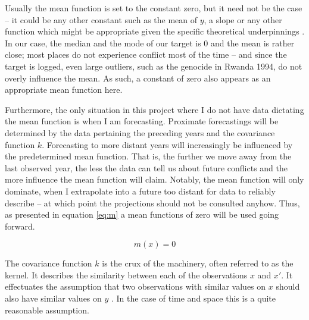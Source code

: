\documentclass[a4paper]{article}
\begin{document}
Usually the mean function is set to the constant zero, but it need not be the case -- it could be any other constant such as the mean of $y$, a slope or any other function which might be appropriate given the specific theoretical underpinnings \citep[28-29]{williams2006gaussian}. In our case, the median and the mode of our target is 0 and the mean is rather close; most places do not experience conflict most of the time -- and since the target is logged, even large outliers, such as the genocide in Rwanda 1994, do not overly influence the mean. As such, a constant of zero also appears as an appropriate mean function here.\par

Furthermore, the only situation in this project where I do not have data dictating the mean function is when I am forecasting. Proximate forecastings will be determined by the data pertaining the preceding years and the covariance function $k$. Forecasting to more distant years will increasingly be influenced by the predetermined mean function. That is, the further we move away from the last observed year, the less the data can tell us about future conflicts and the more influence the mean function will claim. Notably, the mean function will only dominate, when I extrapolate into a future too distant for data to reliably describe -- at which point the projections should not be consulted anyhow. Thus, as presented in equation \ref{eq:m} a mean functions of zero will be used going forward.\par 

\[
m(x) = 0 \tag{6} \label{eq:m}
\]

The covariance function $k$ is the crux of the machinery, often referred to as the kernel. It describes the similarity between each of the observations $x$ and $x'$. It effectuates the assumption that two observations with similar values on $x$ should also have similar values on $y$ \cite[79]{williams2006gaussian}. In the case of time and space this is a quite reasonable assumption.\par 

\end{document}

